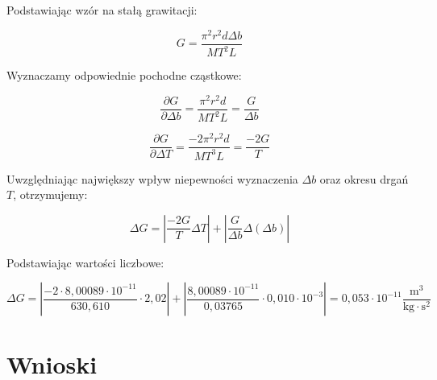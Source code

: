 \documentclass[a4paper,12pt]{article}
\begin{document}
Podstawiając wzór na stałą grawitacji:

\begin{equation*}
    \label{eq:g}
    G = \frac{\pi^2 r^2 d \Delta b}{MT^2L}
\end{equation*}

Wyznaczamy odpowiednie pochodne cząstkowe:

\begin{equation*}
    \frac{\partial G}{\partial \Delta b} = \frac{\pi^2 r^2 d}{MT^2L} = \frac{G}{\Delta b}
\end{equation*}

\begin{equation*}
    \frac{\partial G}{\partial \Delta T} = \frac{-2\pi^2 r^2 d}{MT^3L} = \frac{-2G}{T}
\end{equation*}

Uwzględniając największy wpływ niepewności wyznaczenia $\Delta b$ oraz okresu drgań $T$, otrzymujemy:

\begin{equation*}
    \Delta G = | \frac{-2G}{T} \Delta T | + | \frac{G}{\Delta b} \Delta( \Delta b ) |
\end{equation*}

Podstawiając wartości liczbowe:

\begin{equation*}
    \Delta G = | \frac{-2 \cdot 8{,}00089 \cdot 10^{-11}}{630{,}610} \cdot 2{,}02 | + | \frac{8{,}00089 \cdot 10^{-11}}{0{,}03765} \cdot 0{,}010 \cdot 10^{-3} |
    = 0{,}053 \cdot 10^{-11} \frac{\text{m}^3}{\text{kg} \cdot \text{s}^2}
\end{equation*}



\section{Wnioski}
\end{document}
